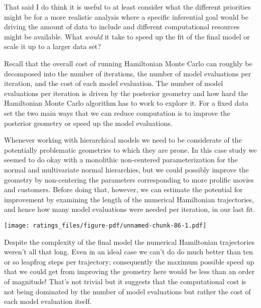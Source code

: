 \documentclass[
  letterpaper,
  DIV=11,
  numbers=noendperiod]{scrartcl}
\newenvironment{Shaded}{\begin{snugshade}}{\end{snugshade}}
\newcommand{\FunctionTok}[1]{\textcolor[rgb]{0.28,0.35,0.67}{#1}}
\newcommand{\NormalTok}[1]{\textcolor[rgb]{0.00,0.23,0.31}{#1}}
\newcommand{\SpecialCharTok}[1]{\textcolor[rgb]{0.37,0.37,0.37}{#1}}
\begin{document}
That said I do think it is useful to at least consider what the
different priorities might be for a more realistic analysis where a
specific inferential goal would be driving the amount of data to include
and different computational resources might be available. What
\emph{would} it take to speed up the fit of the final model or scale it
up to a larger data set?

Recall that the overall cost of running Hamiltonian Monte Carlo can
roughly be decomposed into the number of iterations, the number of model
evaluations per iteration, and the cost of each model evaluation. The
number of model evaluations per iteration is driven by the posterior
geometry and how hard the Hamiltonian Monte Carlo algorithm has to work
to explore it. For a fixed data set the two main ways that we can reduce
computation is to improve the posterior geometry or speed up the model
evaluations.

Whenever working with hierarchical models we need to be considerate of
the potentially problematic geometries to which they are prone. In this
case study we seemed to do okay with a monolithic non-centered
parameterization for the normal and multivariate normal hierarchies, but
we could possibly improve the geometry by non-centering the parameters
corresponding to more prolific movies and customers. Before doing that,
however, we can estimate the potential for improvement by examining the
length of the numerical Hamiltonian trajectories, and hence how many
model evaluations were needed per iteration, in our last fit.

\begin{Shaded}
\end{Shaded}

\texttt{[image: ratings\_files/figure-pdf/unnamed-chunk-86-1.pdf]}

Despite the complexity of the final model the numerical Hamiltonian
trajectories weren't all that long. Even in an ideal case we can't do do
much better than ten or so leapfrog steps per trajectory; consequently
the maximum possible speed up that we could get from improving the
geometry here would be less than an order of magnitude! That's not
trivial but it suggests that the computational cost is not being
dominated by the number of model evaluations but rather the cost of each
model evaluation itself.
\end{document}
